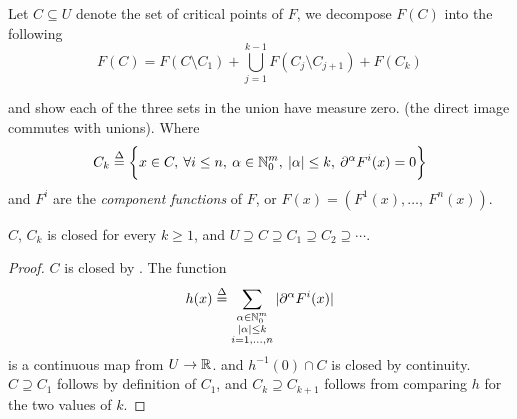 \documentclass[../main-manifolds.tex]{subfiles}
\begin{document}
Let $C\subseteq U$ denote the set of critical points of $F$, we decompose $F(C)$ into the following
\begin{equation}\label{lee-sards-decompose-C}
    F(C) = F(C\setminus C_1) + \bigcup_{j=1}^{k-1} F(C_j\setminus C_{j+1}) + F(C_k)
\end{equation}
    
and show each of the three sets in the union have measure zero. (the direct image commutes with unions). Where
\[
    C_k \overset{\Delta}{=}\biggl\{{x\in C,\: \forall i\leq n,\:\alpha\in\mathbb{N}_0^m,\:|\alpha|\leq k,\: \partial^\alpha F^i(x)=0}\biggr\}
\]
and $F^i$ are the \emph{component functions} of $F$, or $F(x) = (F^{1}(x),\ldots,\: F^{n}(x))$.


\begin{step}[Properties of $C$, $C_k$]
    $C$, $C_k$ is closed for every $k\geq 1$, and 
    $
    U\supseteq C\supseteq C_1\supseteq C_2\supseteq \cdots
    $.
\end{step}
\begin{proof}
    $C$ is closed by . The function 
    \[
        h(x)\overset{\Delta}{=} \sum_{{\substack{\alpha\in\mathbb{N}_0^m\\ |\alpha|\leq k\\ i=1,\ldots,n}}}|\partial^\alpha F^i(x)|
    \]
    is a continuous map from $U\to\mathbb{R}$. and $h^{-1}(0)\cap C$ is closed by continuity. $C\supseteq C_1$ follows by definition of $C_1$, and $C_k\supseteq C_{k+1}$ follows from comparing $h$ for the two values of $k$.
\end{proof}
\end{document}
